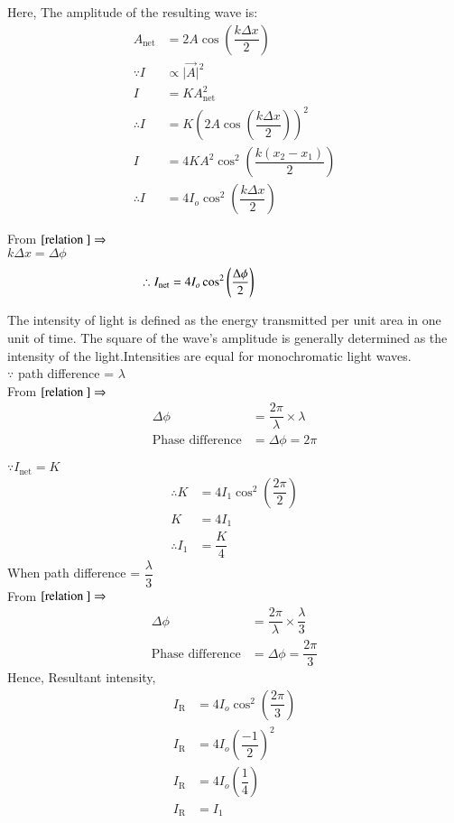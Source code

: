 \documentclass[journal,12pt,twocolumn]{IEEEtran}
\theoremstyle{remark}
\begin{document}
Here,
The amplitude of the resulting wave is: 
\begin{align}
A_\text{net} &= 2A\cos\left(\dfrac{k\Delta x}{2}\right)  \\ 
\because I &\propto \lvert\overrightarrow{A}\rvert^2  \nonumber \\
I &= KA^2_\text{net} \\
\therefore I &= K\left(2A\cos\left(\dfrac{k\Delta x}{2}\right)\right)^2 \nonumber\\
I &= 4KA^2\cos^2\left(\dfrac{k(x_2 - x_1) }{2}\right) \nonumber \\
\therefore I &= 4I_o\cos^2\left(\dfrac{k\Delta x}{2}\right) 
\end{align}

From  $\eqref{relation } \Rightarrow $ \\
  \hspace*{2.5cm} $k\Delta x = \Delta \phi$  
\begin{align} \hspace*{-2cm}
\therefore I_\text{net} = 4I_o\cos^2\left(\dfrac{\Delta \phi}{2}\right) \label{intensity}
\end{align}

The intensity of light is defined as the energy transmitted per unit area in one unit of time. The square of the wave's amplitude is generally determined as the intensity of the light.Intensities are equal for monochromatic light waves.\\
$\because$ path difference = $\lambda$ \\
\hspace*{0.4cm}From $\eqref{relation } \Rightarrow$
\begin{align}
\Delta \phi &= \dfrac{2\pi}{\lambda}  \times \lambda \nonumber \\
\text{Phase difference} &= \Delta \phi = 2\pi
\end{align}

$\because I_{\text{net}} = K$
\begin{align}
   \therefore K &= 4I_1\cos^2\left(\dfrac{2\pi}{2}\right) \nonumber \\
    K &= 4I_1 \nonumber \\
 \therefore    I_1&=\dfrac{K}{4} \label{eq}
\end{align}
When path difference = $\dfrac{\lambda}{3}$ \\
From $\eqref{relation } \Rightarrow$
\begin{align}
\Delta \phi &= \dfrac{2\pi}{\lambda}  \times  \dfrac{\lambda}{3} \nonumber \\
\text{Phase difference} &=  \Delta \phi = \dfrac{2\pi}{3}
\end{align}
Hence,
\hspace*{0.5cm}Resultant intensity,
\begin{align}
I_{\text{R}} &= 4I_o\cos^2\left(\dfrac{2\pi}{3}\right) \nonumber  \\
I_{\text{R}} &= 4I_o\left(\dfrac{-1}{2}\right)^2\nonumber \\
I_{\text{R}} &= 4I_o\left(\dfrac{1}{4}\right)\nonumber \\
I_{\text{R}} &= I_1
\end{align}
\end{document}
